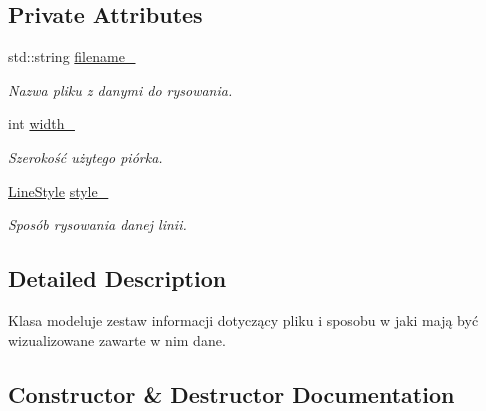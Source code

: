 \subsection*{Private Attributes}
\begin{DoxyCompactItemize}
\item 
std\+::string \hyperlink{class_pz_g_1_1_file_info_a04f77a755e72bcf379844b15d9f0f3ed}{filename\+\_\+}
\begin{DoxyCompactList}\small\item\em Nazwa pliku z danymi do rysowania. \end{DoxyCompactList}\item 
int \hyperlink{class_pz_g_1_1_file_info_a1a1d3ea502a2604eec731ca50a2b438f}{width\+\_\+}
\begin{DoxyCompactList}\small\item\em Szerokość użytego piórka. \end{DoxyCompactList}\item 
\hyperlink{namespace_pz_g_ab0580cdb6bfe9e51d7de2588bc824076}{Line\+Style} \hyperlink{class_pz_g_1_1_file_info_a9141a03aee9840ebe103e4b1b6fa5c9b}{style\+\_\+}
\begin{DoxyCompactList}\small\item\em Sposób rysowania danej linii. \end{DoxyCompactList}\end{DoxyCompactItemize}


\subsection{Detailed Description}
Klasa modeluje zestaw informacji dotyczący pliku i sposobu w jaki mają być wizualizowane zawarte w nim dane. 

\subsection{Constructor \& Destructor Documentation}
